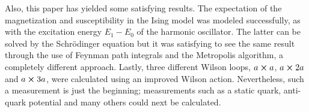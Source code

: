 \documentclass[11pt]{article}
\begin{document}
Also, this paper has yielded some satisfying results. The expectation of the magnetization and susceptibility in the Ising model was modeled successfully, as with the excitation energy $E_1-E_0$ of the harmonic oscillator. The latter can be solved by the Schr\"odinger equation but it was satisfying to see the same result through the use of Feynman path integrals and the Metropolis algorithm, a completely different approach. Lastly, three different Wilson loops, $a\cross a$, $a\cross2a$ and $a\cross3a$, were calculated using an improved Wilson action. Nevertheless, such a measurement is just the beginning; measurements such as a static quark, anti-quark potential and many others could next be calculated.
\end{document}
